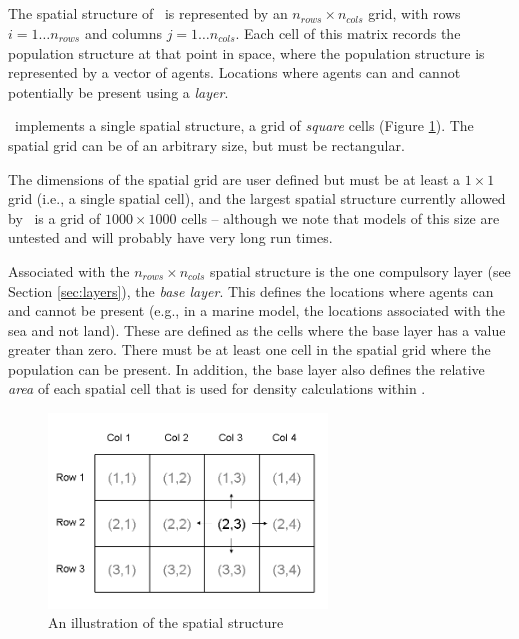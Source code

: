 \subsection{\label{sec:spatial-structure}}
The spatial structure of \IBM\ is represented by an $n_{rows} \times n_{cols}$ grid, with rows $i=1 \dots n_{rows}$ and columns $j=1 \ldots n_{cols}$. Each cell of this matrix records the population structure at that point in space, where the population structure is represented by a vector of agents. Locations where agents can and cannot potentially be present using a \emph{layer}. 

\IBM\ implements a single spatial structure, a grid of \emph{square} cells (Figure \ref{fig:SquareSpatialStructure}). The spatial grid can be of an arbitrary size, but must be rectangular. 

The dimensions of the spatial grid are user defined but must be at least a $1 \times 1$ grid (i.e., a single spatial cell), and the largest spatial structure currently allowed by \IBM\ is a grid of $1000 \times 1000$ cells -- although we note that models of this size are untested and will probably have very long run times. 

Associated with the $n_{rows} \times n_{cols}$ spatial structure is the one compulsory layer (see Section \ref{sec:layers}), the \emph{base layer}. This defines the locations where agents can and cannot be present (e.g., in a marine model, the locations associated with the sea and not land). These are defined as the cells where the base layer has a value greater than zero. There must be at least one cell in the spatial grid where the population can be present. In addition, the base layer also defines the relative \emph{area} of each spatial cell that is used for density calculations within \IBM.

\begin{figure}[htp]
	\centering
	\includegraphics[width=0.66\textwidth]{Figures/SquareStructure}
	\caption{An illustration of the spatial structure}
	\label{fig:SquareSpatialStructure}
\end{figure}


